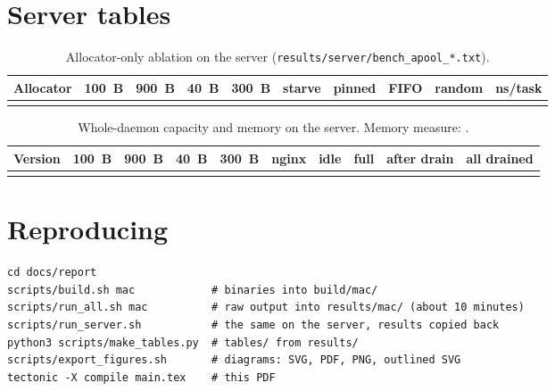 \documentclass[10.5pt,a4paper]{article}
\newcommand{\file}[1]{\texttt{\small #1}}
\begin{document}



\appendix
\section{Server tables}\label{app:server}

\begin{table}[H]
\centering\footnotesize
\setlength{\tabcolsep}{4pt}
\begin{tabularx}{\textwidth}{@{}Yrrrrrrrrr@{}}
\toprule
Allocator & 100~B & 900~B & 40~B & 300~B & starve & pinned & FIFO & random & ns/task \\
\midrule
{}
\bottomrule
\end{tabularx}
\caption{Allocator-only ablation on the server (\file{results/server/bench\_apool\_*.txt}).}
\end{table}

\begin{table}[H]
\centering\footnotesize
\setlength{\tabcolsep}{4pt}
\begin{tabularx}{\textwidth}{@{}Yrrrrrrrrc@{}}
\toprule
Version & 100~B & 900~B & 40~B & 300~B & nginx & idle & full & after drain & all drained \\
\midrule
{}
\bottomrule
\end{tabularx}
\caption{Whole-daemon capacity and memory on the server. Memory measure: \texttt{\capacityServerMeasure{}}.}
\end{table}

\section{Reproducing}

\begin{verbatim}
cd docs/report
scripts/build.sh mac            # binaries into build/mac/
scripts/run_all.sh mac          # raw output into results/mac/ (about 10 minutes)
scripts/run_server.sh           # the same on the server, results copied back
python3 scripts/make_tables.py  # tables/ from results/
scripts/export_figures.sh       # diagrams: SVG, PDF, PNG, outlined SVG
tectonic -X compile main.tex    # this PDF
\end{verbatim}
\end{document}
